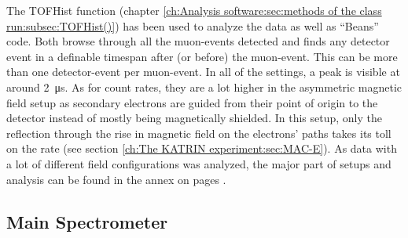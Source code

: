   	
  The TOFHist function (chapter \ref{ch:Analysis software:sec:methods of the class run:subsec:TOFHist()}) has been used to analyze the data as well as ``Beans'' code.
  Both browse through all the muon-events detected and finds any detector event in a definable timespan after (or before) the muon-event. This can be more than one detector-event per muon-event. In all of the settings, a peak is visible at around \SI{2}{\micro\second}. As for count rates, they are a lot higher in the asymmetric magnetic field setup as secondary electrons are guided from their point of origin to the detector instead of mostly being magnetically shielded. In this setup, only the reflection through the rise in magnetic field on the electrons' paths takes its toll on the rate (see section \ref{ch:The KATRIN experiment:sec:MAC-E}).
  As data with a lot of different field configurations was analyzed, the major part of setups and analysis can be found in the annex on pages \pageref{ch:annex:sec:A3}.
  
  
  \subsection{Main Spectrometer}
  \label{ch:Analysis:sec:Monitor Spectrometer Measurements:subsec:Main Spectrometer}
  
